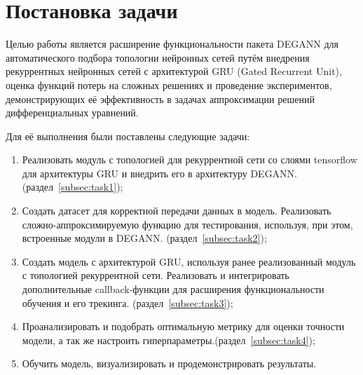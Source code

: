 
\section{Постановка задачи}
\label{sec:task}

Целью работы является расширение функциональности пакета DEGANN для автоматического подбора топологии нейронных сетей путём внедрения рекуррентных нейронных сетей с архитектурой GRU (Gated Recurrent Unit), оценка функций потерь на сложных решениях и проведение экспериментов, демонстрирующих её эффективность в задачах аппроксимации решений дифференциальных уравнений.

Для её выполнения были поставлены следующие задачи:
\begin{enumerate}
    \item Реализовать модуль с топологией для рекуррентной сети со слоями tensorflow для архитектуры GRU и внедрить его в архитектуру DEGANN. (раздел~\ref{subsec:task1});
    \item Создать датасет для корректной передачи данных в модель. Реализовать сложно-аппроксимируемую функцию для тестирования, используя, при этом, встроенные модули в DEGANN. (раздел~\ref{subsec:task2});
    \item Создать модель с архитектурой GRU, используя ранее реализованный модуль с топологией рекуррентной сети. Реализовать и интегрировать дополнительные callback-функции для расширения функциональности обучения и его трекинга. (раздел~\ref{subsec:task3});
    \item Проанализировать и подобрать оптимальную метрику для оценки точности модели, а так же настроить гиперпараметры.(раздел~\ref{subsec:task4});
    \item Обучить модель, визуализировать и продемонстрировать результаты.
\end{enumerate}
